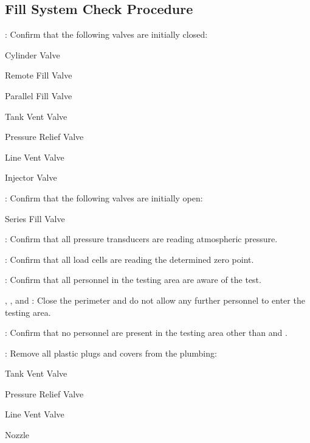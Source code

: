 \newpage

\subsection{Fill System Check Procedure}
\begin{checklist}
    \item \primary{}: Confirm that the following valves are initially closed:
    \begin{checklist}
        \item Cylinder Valve
        \item Remote Fill Valve
        \item Parallel Fill Valve
        \item Tank Vent Valve
        \item Pressure Relief Valve
        \item Line Vent Valve
        \item Injector Valve
    \end{checklist}
    \item \primary{}: Confirm that the following valves are initially open:
    \begin{checklist}
        \item Series Fill Valve
    \end{checklist}
    \item \daq: Confirm that all pressure transducers are reading atmospheric pressure.
    \item \daq: Confirm that all load cells are reading the determined zero point.
    \item \ops: Confirm that all personnel in the testing area are aware of the test.
    \item \peri{}, \perii{}, and \periii{}: Close the perimeter and do not allow any further personnel to enter the testing area.
    \item \secondary: Confirm that no personnel are present in the testing area other than \primary{} and \secondary.
    \item \primary: Remove all plastic plugs and covers from the plumbing:
    \begin {checklist}
        \item Tank Vent Valve
        \item Pressure Relief Valve
        \item Line Vent Valve
        \item Nozzle
    \end {checklist}

\end{checklist}
